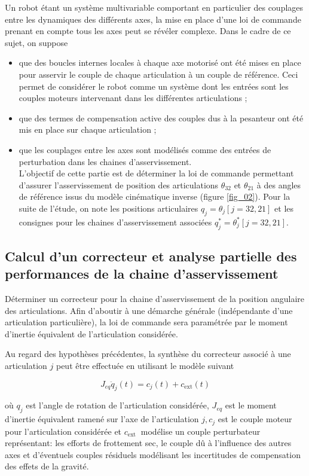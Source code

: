 Un robot étant un système multivariable comportant en particulier des couplages entre les dynamiques des différents axes, la mise en place d'une loi de commande prenant en compte tous les axes peut se révéler complexe. Dans le cadre de ce sujet, on suppose

\begin{itemize}
  \item que des boucles internes locales à chaque axe motorisé ont été mises en place pour asservir le couple de chaque articulation à un couple de référence. Ceci permet de considérer le robot comme un système dont les entrées sont les couples moteurs intervenant dans les différentes articulations ;
  \item que des termes de compensation active des couples dus à la pesanteur ont été mis en place sur chaque articulation ;
  \item que les couplages entre les axes sont modélisés comme des entrées de perturbation dans les chaines d'asservissement.\\
L'objectif de cette partie est de déterminer la loi de commande permettant d'assurer l'asservissement de position des articulations $\theta_{32}$ et $\theta_{21}$ à des angles de référence issus du modèle cinématique inverse (figure \ref{fig_02}). Pour la suite de l'étude, on note les positions articulaires $q_{j}=\theta_{j}[j=32,21]$ et les consignes pour les chaines d'asservissement associées $q_{j}^{*}=\theta_{j}^{*}[j=32,21]$.
\end{itemize}

\subsection{Calcul d'un correcteur et analyse partielle des performances de la chaine d'asservissement}
\begin{obj}
Déterminer un correcteur pour la chaine d'asservissement de la position angulaire des articulations. Afin d'aboutir à une démarche générale (indépendante d'une articulation particulière), la loi de commande sera paramétrée par le moment d'inertie équivalent de l'articulation considérée.
\end{obj}

Au regard des hypothèses précédentes, la synthèse du correcteur associé à une articulation $j$ peut être effectuée en utilisant le modèle suivant

$$
J_{e q} \ddot{q}_{j}(t)=c_{j}(t)+c_{\mathrm{ext}}(t)
$$

où $q_{j}$ est l'angle de rotation de l'articulation considérée, $J_{e q}$ est le moment d'inertie équivalent ramené sur l'axe de l'articulation $j, c_{j}$ est le couple moteur pour l'articulation considérée et $c_{\text {ext }}$ modélise un couple perturbateur représentant: les efforts de frottement sec, le couple dû à l'influence des autres axes et d'éventuels couples résiduels modélisant les incertitudes de compensation des effets de la gravité.

